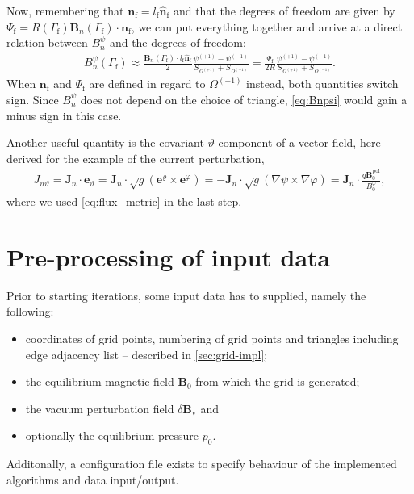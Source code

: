 \documentclass[a4paper, twoside, 10pt, english]{article}
\numberwithin{equation}{section}
\let\temp\varrho
\let\varrho\rho
\let\rho\temp
\let\temp\vartheta
\let\vartheta\theta
\let\theta\temp
\let\temp\varphi
\let\varphi\phi
\let\phi\temp
\let\vec\symbf
\newcommand*\grad{\ensuremath{\nabla}}
\newcommand*\pol{\ensuremath{\textrm{pol}}}  %
\newcommand*\Bvac{\ensuremath{\delta \vec{B}_{\text{v}}}}  %
\newcommand*\fs{\ensuremath{\textrm{f}}}  %
\begin{document}
Now, remembering that $\vec{n}_{\fs} = l_{\fs} \hat{\vec{n}}_{\fs}$ and that the degrees of freedom are given by $\Psi_{\fs} = R (\Gamma_{\fs}) \vec{B}_{n} (\Gamma_{\fs}) \cdot \vec{n}_{\fs}$, we can put everything together and arrive at a direct relation between $B_{n}^{\psi}$ and the degrees of freedom:
\begin{gather}
  B_{n}^{\psi} (\Gamma_{\fs}) \approx \frac{\vec{B}_{n} (\Gamma_{\fs}) \cdot l_{\fs} \hat{\vec{n}}_{\fs}}{2} \frac{\psi^{(+1)} - \psi^{(-1)}}{S_{\Omega^{(+1)}} + S_{\Omega^{(-1)}}} = \frac{\Psi_{\fs}}{2 R} \frac{\psi^{(+1)} - \psi^{(-1)}}{S_{\Omega^{(+1)}} + S_{\Omega^{(-1)}}}. \label{eq:Bnpsi}
\end{gather}
When $\vec{n}_{\fs}$ and $\Psi_{\fs}$ are defined in regard to $\Omega^{(+1)}$ instead, both quantities switch sign. Since $B_{n}^{\psi}$ does not depend on the choice of triangle, \cref{eq:Bnpsi} would gain a minus sign in this case.

Another useful quantity is the covariant $\theta$ component of a vector field, here derived for the example of the current perturbation,
\begin{gather}
  J_{n \theta} = \vec{J}_{n} \cdot \vec{e}_{\theta} = \vec{J}_{n} \cdot \sqrt{g} \left ( \vec{e}^{\rho} \times \vec{e}^{\phi} \right ) = -\vec{J}_{n} \cdot \sqrt{g} (\grad \psi \times \grad \phi) = \vec{J}_{n} \cdot \frac{q \vec{B}_{0}^{\pol}}{B_{0}^{\phi}},
\end{gather}
where we used \cref{eq:flux_metric} in the last step.

\clearpage
\section{Pre-processing of input data}
\label{sec:inputs}

Prior to starting iterations, some input data has to supplied, namely the following:
\begin{itemize}
\item coordinates of grid points, numbering of grid points and triangles including edge adjacency list -- described in \cref{sec:grid-impl};
\item the equilibrium magnetic field $\vec{B}_{0}$ from which the grid is generated;
\item the vacuum perturbation field $\Bvac$ and
\item optionally the equilibrium pressure $p_{0}$.
\end{itemize}
Additonally, a configuration file exists to specify behaviour of the implemented algorithms and data input/output.
\end{document}
